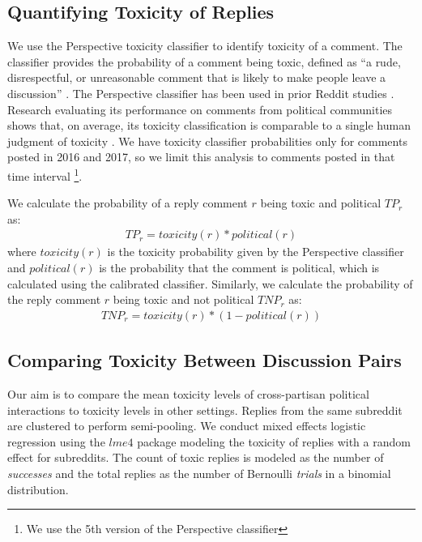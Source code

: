 \documentclass[letterpaper]{article} %
\begin{document}
\subsection{Quantifying Toxicity of Replies}

We use the Perspective toxicity classifier to identify toxicity of a comment. The classifier provides the probability of a comment being toxic, defined as ``a rude, disrespectful, or unreasonable comment that is likely to make people leave a discussion'' \cite{wulczyn2017ex}. The Perspective classifier has been used in prior Reddit studies \cite{mittos2020analyzing,xia2020exploring}. Research evaluating its performance on comments from political communities shows that, on average, its toxicity classification is comparable to a single human judgment of toxicity \cite{rajadesingan2020quick}. We have toxicity classifier probabilities only for comments posted in 2016 and 2017, so we limit this analysis to comments posted in that time interval \footnote{We use the 5th version of the Perspective classifier}.

We calculate the probability of a reply comment $r$ being toxic and political $TP_r$ as:
\begin{align*}
TP_{r} = toxicity(r) * political(r)
\end{align*}
where $toxicity(r)$ is the toxicity probability given by the Perspective classifier and $political(r)$ is the probability that the comment is political, which is calculated using the calibrated classifier. Similarly, we calculate the probability of the reply comment $r$ being toxic and not political $TNP_r$ as:
\begin{align*}
TNP_r = toxicity(r) *(1-political(r))
\end{align*}


\subsection{Comparing Toxicity Between Discussion Pairs}

Our aim is to compare the mean toxicity levels of cross-partisan political interactions to toxicity levels in other settings. Replies from the same subreddit are clustered to perform semi-pooling. We conduct mixed effects logistic regression using the $lme4$ package \cite{bates2014fitting} modeling the toxicity of replies with a random effect for subreddits. The count of toxic replies is modeled as the number of \textit{successes} and the total replies as the number of Bernoulli \textit{trials} in a binomial distribution.
\end{document}
